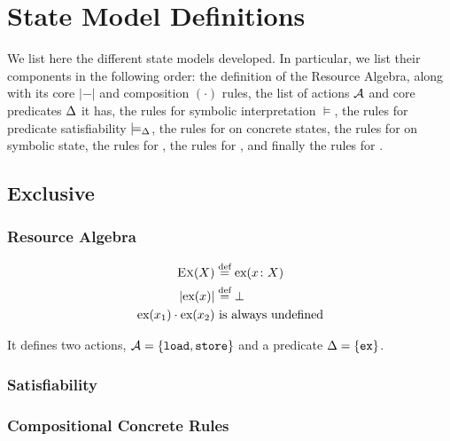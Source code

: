 \chapter{State Model Definitions} \label{ap:definitions}

We list here the different state models developed. In particular, we list their components in the following order: the definition of the Resource Algebra, along with its core $|-|$ and composition $(\cdot)$ rules, the list of actions ${\cal{A}}$ and core predicates $\Delta$ it has, the rules for symbolic interpretation $\models$, the rules for predicate satisfiability $\models_{\Delta}$, the rules for \execac{} on concrete states, the rules for \execac{} on symbolic state, the rules for \consume, the rules for \produce, and finally the rules for \fix.

\section{Exclusive} \label{rules:ex}

\subsection{Resource Algebra}

\begin{align*}
 	\textsc{Ex}(X) &\stackrel{\textnormal{def}}=	\text{ex}(x\colon X)\\
 	|\text{ex}(x)| &\stackrel{\textnormal{def}}= \bot\\
 	\text{ex}(x_1) \cdot \text{ex}(x_2)&~\text{is always undefined}
\end{align*}

It defines two actions, ${\cal{A}}=\{\texttt{load}, \texttt{store}\}$ and a predicate $\Delta=\{\texttt{ex}\}$.

\subsection{Satisfiability}


\subsection{Compositional Concrete Rules}



